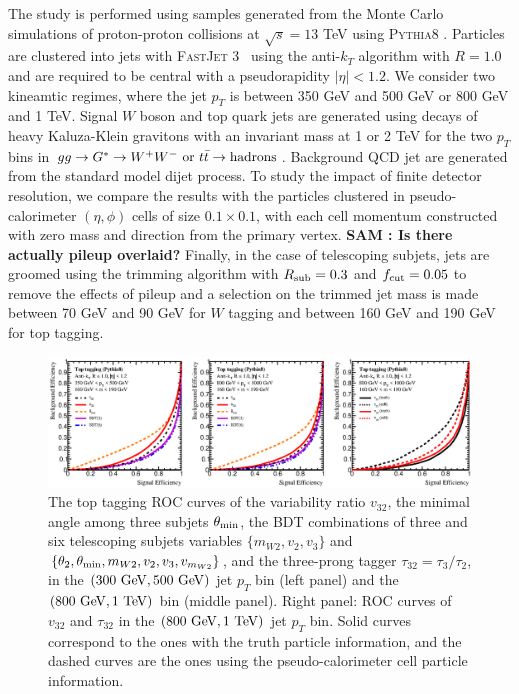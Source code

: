 \documentclass[aps,prl,floatfix,preprintnumbers,twocolumn,groupedaddress,nofootinbib]{revtex4-1}
\begin{document}
The study is performed using samples generated from the Monte Carlo simulations of proton-proton collisions at $\sqrt{s}=13$ TeV using \textsc{Pythia8} \cite{Sjostrand:2007gs}. Particles are clustered into jets with \textsc{FastJet} 3~\cite{Cacciari:2011ma} using the anti-$k_T$ algorithm \cite{Cacciari:2008gp} with $R=1.0$ and are required to be central with a pseudorapidity $|\eta|<1.2$. We consider two kineamtic regimes, where the jet $p_T$ is between 350 GeV and 500 GeV or 800 GeV and 1 TeV. Signal $W$ boson and top quark jets are generated using decays of heavy Kaluza-Klein gravitons with an invariant mass at 1 or 2 TeV for the two $p_T$ bins in $gg\rightarrow G^*\rightarrow W^+W^-~{\rm or}~t\bar t\rightarrow {\rm hadrons}$. Background QCD jet are generated from the standard model dijet process. To study the impact of finite detector resolution, we compare the results with the particles clustered in pseudo-calorimeter $(\eta,\phi)$ cells of size $0.1\times 0.1$, with each cell momentum constructed with zero mass and direction from the primary vertex.  \textbf{\color{blue} SAM : Is there actually pileup overlaid?} Finally, in the case of telescoping subjets, jets are groomed using the trimming algorithm with $R_{\rm sub}=0.3$ and $f_{\rm cut}=0.05$ to remove the effects of pileup and a selection on the trimmed jet mass is made between 70 GeV and 90 GeV for $W$ tagging and between 160 GeV and 190 GeV for top tagging.

\begin{figure}
    \includegraphics[width=2\columnwidth]{plots/Top_ROCs_1.eps}
    \caption{The top tagging ROC curves of the variability ratio $v_{32}$, the minimal angle among three subjets $\theta_{\rm min}$, the BDT combinations of three and six telescoping subjets variables $\{m_{W2},v_2,v_3\}$ and $\{\theta_2,\theta_{\rm min},m_{W2},v_2,v_3,v_{m_{W2}}\}$, and the three-prong tagger $\tau_{32}=\tau_{3}/\tau_{2}$, in the $(300~{\rm GeV}, 500~{\rm GeV})$ jet $p_T$ bin (left panel) and the $(800~{\rm GeV}, 1~{\rm TeV})$ bin (middle panel). Right panel: ROC curves of $v_{32}$ and $\tau_{32}$ in the $(800~{\rm GeV}, 1~{\rm TeV})$ jet $p_T$ bin. Solid curves correspond to the ones with the truth particle information, and the dashed curves are the ones using the pseudo-calorimeter cell particle information.}
\label{ROC_top}
\end{figure}
\end{document}
